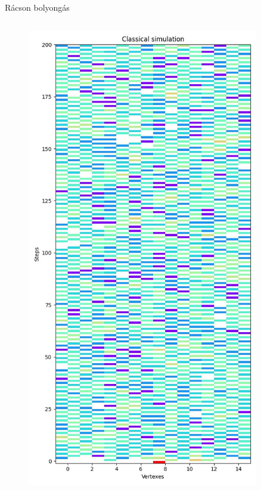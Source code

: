 \documentclass[aspectratio=169]{beamer}
\begin{document}
\begin{frame}{Rácson bolyongás}

  \begin{columns}[onlytextwidth]
    \begin{column}{.23\textwidth}
      \begin{figure}
        \includegraphics[width=0.9\textwidth]{./tdk_figures/results/grid/classical.jpg}
      \end{figure}
    \end{column}

\end{columns}
\end{frame}
\end{document}

